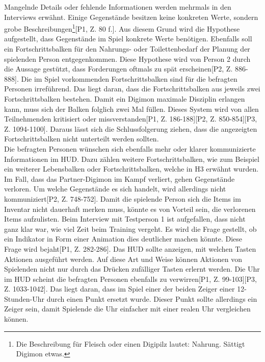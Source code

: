 Mangelnde Details oder fehlende Informationen werden mehrmals in den Interviews erwähnt.
Einige Gegenstände besitzen keine konkreten Werte, sondern grobe Beschreibungen\footnote{Die Beschreibung für Fleisch oder einen Digipilz lautet: \glqq Nahrung. Sättigt Digimon etwas.\grqq}[P1, Z. 80 f.].
Aus diesem Grund wird die Hypothese aufgestellt, dass Gegenstände im Spiel konkrete Werte benötigen\hypothesis[P1, Z. 143 f.][P3, Z. 1315 f.].
Ebenfalls soll ein Fortschrittsbalken für den Nahrungs- oder Toilettenbedarf der Planung der spielenden Person entgegenkommen\hypothesis[P1, Z. 230 f.].
Diese Hypothese wird von Person 2 durch die Aussage gestützt, dass Forderungen oftmals zu spät erscheinen[P2, Z. 886-888].
Die im Spiel vorkommenden Fortschrittsbalken sind für die befragten Personen irreführend.
Das liegt daran, dass die Fortschrittsbalken aus jeweils zwei Fortschrittsbalken bestehen.
Damit ein Digimon maximale Disziplin erlangen kann, muss sich der Balken folglich zwei Mal füllen.
Dieses System wird von allen Teilnehmenden kritisiert oder missverstanden[P1, Z. 186-188][P2, Z. 850-854][P3, Z. 1094-1100].
Daraus lässt sich die Schlussfolgerung ziehen, dass die angezeigten Fortschrittsbalken nicht unterteilt werden sollten\hypothesis. \\

Die befragten Personen wünschen sich ebenfalls mehr oder klarer kommunizierte Informationen im \ac{HUD}.
Dazu zählen weitere Fortschrittsbalken, wie zum Beispiel ein weiterer Lebensbalken oder Fortschrittsbalken, welche in H3 erwähnt wurden\hypothesis[P2, Z. 750-754][P3, Z. 1160-1173][P3, Z. 1245-125].
Im Fall, dass das Partner-Digimon im Kampf verliert, gehen Gegenstände verloren.
Um welche Gegenstände es sich handelt, wird allerdings nicht kommuniziert[P2, Z. 748-752].
Damit die spielende Person sich die Items im Inventar nicht dauerhaft merken muss, könnte es von Vorteil sein, die verlorenen Items aufzulisten\hypothesis.
Beim Interview mit Testperson 1 ist aufgefallen, dass nicht ganz klar war, wie viel Zeit beim Training vergeht.
Es wird die Frage gestellt, ob ein Indikator in Form einer Animation dies deutlicher machen könnte\hypothesis.
Diese Frage wird bejaht[P1, Z. 282-286]. Das \ac{HUD} sollte anzeigen, mit welchen Tasten Aktionen ausgeführt werden.
Auf diese Art und Weise können Aktionen von Spielenden nicht nur durch das Drücken zufälliger Tasten erlernt werden\hypothesis[P1, Z. 59-62][P3, Z. 1000-1009][P3, Z. 1113-1116].
Die Uhr im \ac{HUD} scheint die befragten Personen ebenfalls zu verwirren[P1, Z. 99-103][P3, Z. 1033-1042].
Das liegt daran, dass im Spiel einer der beiden Zeiger einer 12-Stunden-Uhr durch einen Punkt ersetzt wurde.
Dieser Punkt sollte allerdings ein Zeiger sein, damit Spielende die Uhr einfacher mit einer realen Uhr vergleichen können\hypothesis.\\


